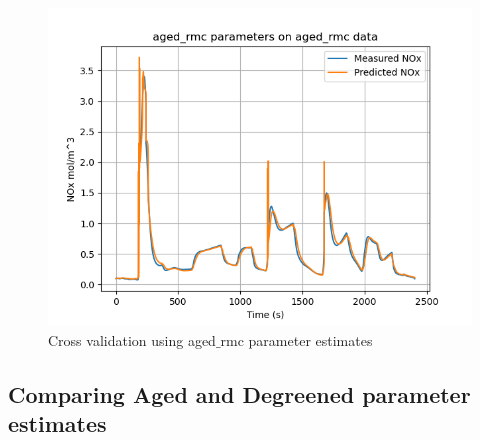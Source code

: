 \begin{figure}[H]
\begin{minipage}{0.33\textwidth}
                \includegraphics[width = \textwidth]{./figs/figs_new_mdl/aged_rmc_aged_rmc.png}
        \end{minipage}
        \caption{Cross validation using aged$\_$rmc parameter estimates}
\end{figure}


\subsection{Comparing Aged and Degreened parameter estimates}

